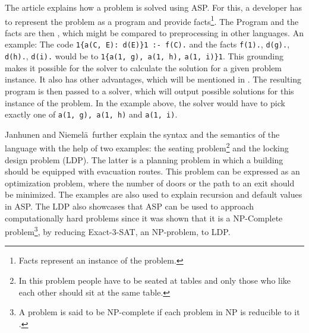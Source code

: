 \documentclass[runningheads]{llncs}
\newcommand{\authorquote}{Janhunen and Niemelä~}
\begin{document}
The article explains how a problem is solved using ASP.  For this, a developer  has to represent the problem as a program and provide facts\footnote{Facts represent an instance of the problem.}.  The Program and the facts are then , which might be compared to preprocessing in other languages. An example: The code \verb|1{a(C, E): d(E)}1 :- f(C).| and the facts \verb|f(1).|, \verb|d(g).|, \verb|d(h).|, \verb|d(i).| would be  to \verb|1{a(1, g), a(1, h),| \verb|a(1, i)}1|. This grounding makes it possible for the solver to calculate the solution for a given problem instance. It also has other advantages, which will be mentioned in .  The resulting program is then passed to a solver, which will output possible solutions for this instance of the problem. In the example above, the solver would have to pick exactly one of \verb|a(1, g), a(1, h)| and \verb|a(1, i)|. 


\authorquote further explain the syntax and the semantics of the language with the help of two examples: the seating problem\footnote{In this problem people have to be seated at tables and only those who like each other should sit at the same table.} and the locking design problem (LDP). The latter is a planning problem  in which a building should be equipped with evacuation routes. This problem can be expressed as an optimization problem, where the number of doors or the path to an exit should be minimized. The examples are also used to explain recursion and default values in ASP. The LDP also showcases that ASP can be used to approach computationally hard problems since it was shown that it is a NP-Complete problem\footnote{A problem is said to be NP-complete if each problem in NP is reducible to it \cite[p.~43]{np_complete}.}, by reducing Exact-3-SAT, an NP-problem, to LDP. 
\end{document}
